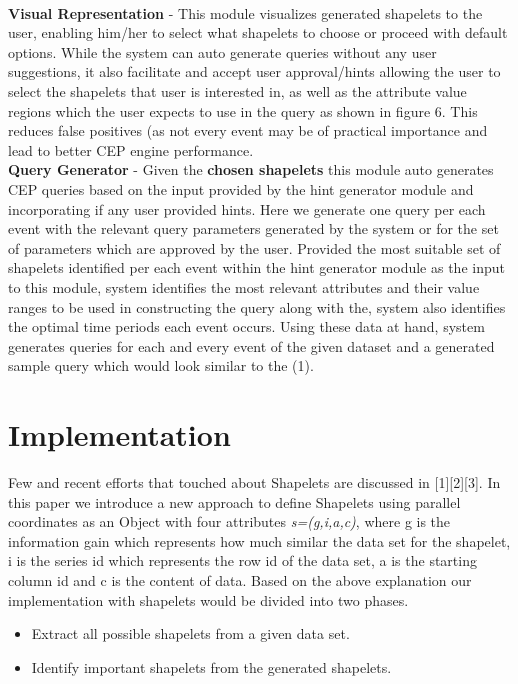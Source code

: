 \documentclass[conference]{IEEEtran}  %
\begin{document}
\smallskip\\
\textbf{Visual Representation} - This module visualizes generated shapelets to the user, enabling him/her to select what shapelets to choose or proceed with default options. While the system can auto generate queries without any user suggestions, it also facilitate and accept user approval/hints allowing the user to select the shapelets that user is interested in, as well as the attribute value regions which the user expects to use in the query as shown in figure 6. This reduces false positives (as not every event may be of practical importance and lead to better CEP engine performance.
\smallskip\\
\textbf{Query Generator} - Given the \textbf{chosen shapelets} this module auto generates CEP queries based on the input provided by the hint generator module and incorporating if any user provided hints. Here we generate one query per each event with the relevant query parameters generated by the system or for the set of parameters which are approved by the user. Provided the most suitable set of shapelets identified per each event within the hint generator module as the input to this module, system identifies the most relevant attributes and their value ranges to be used in constructing the query along with the, system also identifies the optimal time periods each event occurs. Using these data at hand, system generates queries for each and every event of the given dataset and a generated sample query which would look similar to the (1).

\section{Implementation}
Few and recent efforts that touched about Shapelets are discussed in [1][2][3]. In this paper we introduce a new approach to define Shapelets using parallel coordinates as an Object with four attributes \textit{s=(g,i,a,c)}, where g is the information gain which represents how much similar the data set for the shapelet, i is the series id which represents the row id of the data set, a is the starting column id and c is the content of data. Based on the above explanation our implementation with shapelets would be divided into two phases.

\begin{itemize}
\item Extract all possible shapelets from a given data set.
\item Identify important shapelets from the generated shapelets.
\end{itemize}
\end{document}
